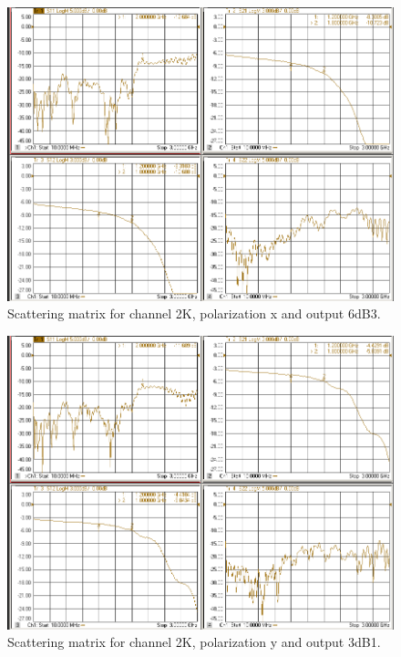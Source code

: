 \documentclass[12pt,a4paper,oneside]{article}
\begin{document}
\begin{figure}[H]
\centering
\includegraphics[width=0.9\linewidth]{VNA_results/2Kx_6dB3.png}
\caption{Scattering matrix for channel 2K, polarization x and output 6dB3.}
\label{fig:2Kx_6dB3}
\end{figure}


\begin{figure}[H]
\centering
\includegraphics[width=0.9\linewidth]{VNA_results/2Ky_3dB1.png}
\caption{Scattering matrix for channel 2K, polarization y and output 3dB1.}
\label{fig:2Ky_3dB1}
\end{figure}
\end{document}
